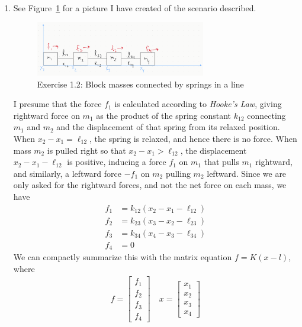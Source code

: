 \documentclass[12pt]{article}
\newenvironment{sol}[1][Solution]{\begin{trivlist}
		\item[\hskip \labelsep {\bfseries #1:}]}{\end{trivlist}}
\begin{document}
\begin{sol}
	\
	\begin{enumerate}[label=(\alph*)]
		\item 	See Figure~\ref{ex:1.2} for a picture I have created of the scenario described.
		\begin{figure}
			\centering
			\includegraphics[width=0.7\textwidth]{exercise-01-02-hookes-law}
			\caption{Exercise 1.2: Block masses connected by springs in a line}
			\label{ex:1.2}
		\end{figure}
		I presume that the force $f_1$ is calculated according to \emph{Hooke's Law}, giving
		rightward force on $m_1$ as the product of the spring constant $k_{12}$ connecting
		$m_1$ and $m_2$ and the displacement of that spring from its relaxed position.
		When $x_2-x_1=\ell_{12}$, the spring is relaxed, and hence there is no force. When
		mass $m_2$ is pulled right so that $x_2-x_1>\ell_{12}$, the displacement $x_2-x_1-\ell_{12}$
		is positive, inducing a force $f_1$ on $m_1$ that pulls $m_1$ rightward, and similarly,
		a leftward force $-f_1$ on $m_2$ pulling $m_2$ leftward. Since we are only asked
		for the rightward forces, and not the net force on each mass, we have
		\begin{align*}
			f_1&=k_{12}(x_2-x_1-\ell_{12})\\
			f_2&=k_{23}(x_3-x_2-\ell_{23})\\
			f_3&=k_{34}(x_4-x_3-\ell_{34})\\
			f_4&=0
		\end{align*}
		We can compactly summarize this with the matrix equation $f=K(x-l)$, where
		\begin{align*}
			f=\begin{bmatrix}
				f_1\\
				f_2\\
				f_3\\
				f_4
			\end{bmatrix}
			\quad
			x=\begin{bmatrix}
				x_1\\
				x_2\\
				x_3\\
				x_4
			\end{bmatrix}

\end{align*}
\end{enumerate}
\end{sol}
\end{document}
